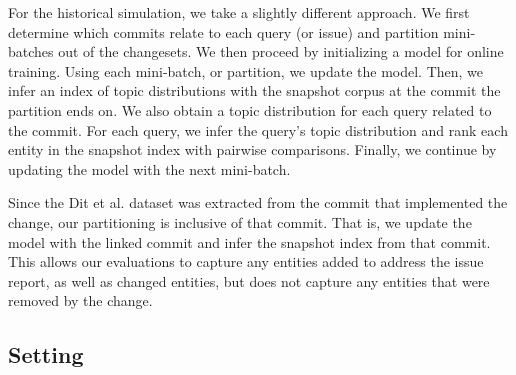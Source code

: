 For the historical simulation, we take a slightly different approach.  We first
determine which commits relate to each query (or issue) and partition
mini-batches out of the changesets.  We then proceed by initializing a model for
online training.  Using each mini-batch, or partition, we update the model.
Then, we infer an index of topic distributions with the snapshot corpus at the
commit the partition ends on.  We also obtain a topic distribution for each
query related to the commit.  For each query, we infer the query's topic
distribution and rank each entity in the snapshot index with pairwise
comparisons. Finally, we continue by updating the model with the next
mini-batch.

Since the Dit et al. dataset was extracted from the commit that implemented the
change, our partitioning is inclusive of that commit.  That is, we update the
model with the linked commit and infer the snapshot index from that commit.
This allows our evaluations to capture any entities added to address the issue
report, as well as changed entities, but does not capture any entities that were
removed by the change.




\subsection{Setting}

